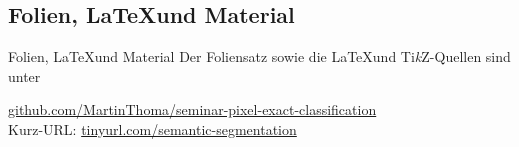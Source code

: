 \subsection{Folien, \LaTeX und Material}
\begin{frame}{Folien, \LaTeX und Material}
Der Foliensatz sowie die \LaTeX und Ti\textit{k}Z-Quellen sind unter

\href{https://github.com/MartinThoma/seminar-pixel-exact-classification}{github.com/MartinThoma/seminar-pixel-exact-classification}
\\

Kurz-URL:
\href{http://tinyurl.com/semantic-segmentation}{tinyurl.com/semantic-segmentation}
\end{frame}
